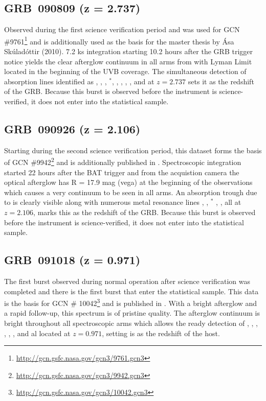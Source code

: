 \documentclass{aa}    %
\begin{document}
\subsection{GRB~090809 (z = 2.737)}
Observed during the first science verification period and was used for GCN
\#9761\footnote{\url{http://gcn.gsfc.nasa.gov/gcn3/9761.gcn3}} and is
additionally used as the basis for the master thesis by \'Asa Sk\'ulad\'ottir
(2010). 7.2 ks integration starting 10.2 hours after the GRB trigger notice
yields the clear afterglow continuum in all arms from with Lyman Limit located
in the beginning of the UVB coverage. The simultaneous detection of absorption
lines identified as \lya, \SIii, \oi, \SIi$^*$, \SIiv, \civ, \feii, \alii,
\aliii and \mgii at $z = 2.737$ sets it as the redshift of the GRB. Because this burst is observed before the instrument is
science-verified, it does not enter into the statistical sample.

\subsection{GRB~090926 (z = 2.106)}
Starting during the second science verification period, this dataset forms the
basis of GCN \#9942\footnote{\url{http://gcn.gsfc.nasa.gov/gcn3/9942.gcn3}} and
is additionally published in \citet{DElia2010}. Spectroscopic integration
started 22 hours after the BAT trigger and from the acquistion camera the
optical afterglow has R = 17.9 mag (vega) at the beginning of the observations
which causes a very continuum to be seen in all arms. An absorption trough due
to \lya is clearly visible along with numerous metal resonance lines \civ,
\SIii, \SIii$^*$ \feii, \mgii, all at $z = 2.106$, marks this as the redshift of
the GRB. Because this burst is observed before the instrument is
science-verified, it does not enter into the statistical sample.

\subsection{GRB~091018 (z = 0.971)}
The first burst observed during normal operation after science verification was
completed and there is the first burst that enter the statistical sample. This
data is the basis for GCN \#
10042\footnote{\url{http://gcn.gsfc.nasa.gov/gcn3/10042.gcn3}} and is published
in \citet{Wiersema2012}. With a bright afterglow and a rapid follow-up, this
spectrum is of pristine quality. The afterglow continuum is bright throughout
all spectroscopic arms which allows the ready detection of \alii, \aliii, \feii,
\mnii, \mgii, \mgi, and \caii al located at $z = 0.971$, setting is as the
redshift of the host.
\end{document}

